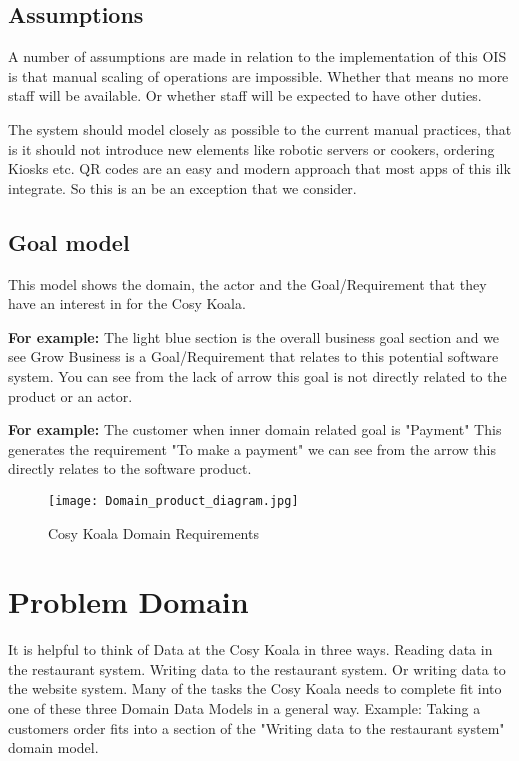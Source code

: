 \documentclass{article}
\begin{document}
\subsection{Assumptions}
A number of assumptions are made in relation to the implementation of this OIS is that manual scaling of operations are impossible. Whether that means no more staff will be available. Or whether staff will be expected to have other duties.

The system should model closely as possible to the current manual practices, that is it should not introduce new elements like robotic servers or cookers, ordering Kiosks etc.
QR codes are an easy and modern approach that most apps of this ilk integrate. So this is an be an exception that we consider.

\clearpage
\subsection{Goal model}
This model shows the domain, the actor and the Goal/Requirement that they have an interest in for the Cosy Koala. 

\textbf{For example:} The light blue section is the overall business goal section and we see Grow Business is a Goal/Requirement that relates to this potential software system. You can see from the lack of arrow this goal is not directly related to the product or an actor.


\textbf{For example:}  The customer when inner domain related goal is "Payment" This generates the requirement "To make a payment" we can see from the arrow this directly relates to the software product.
\begin{figure}[!ht]
    \centering
    \texttt{[image: Domain\_product\_diagram.jpg]}
    \caption{Cosy Koala Domain Requirements}
    \label{fig:Domain_Product}
\end{figure}

\clearpage
\section{Problem Domain}
It is helpful to think of Data at the Cosy Koala in three ways. Reading data in the restaurant system. Writing data to the restaurant system. Or writing data to the website system. 
Many of the tasks the Cosy Koala needs to complete fit into one of these three Domain Data Models in a general way. 
Example: Taking a customers order fits into a section of the "Writing data to the restaurant system" domain model.
\end{document}

